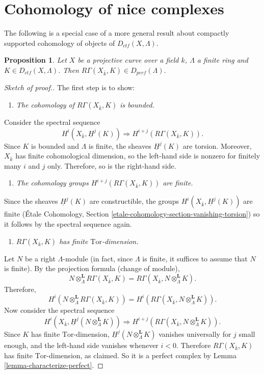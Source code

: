 \documentclass{stacks-project}
\theoremstyle{plain}
\newtheorem{proposition}[subsection]{Proposition}
\theoremstyle{definition}
\theoremstyle{remark}
\numberwithin{equation}{subsection}
\begin{document}
\section{Cohomology of nice complexes}
\label{section-cohomology-ctf}

\noindent
The following is a special case of a more general result about
compactly supported cohomology of objects of $D_{ctf}(X, \Lambda)$.

\begin{proposition}
\label{proposition-projective-curve-constructible-cohomology}
Let $X$ be a projective curve over a field $k$, $\Lambda$ a finite ring and
$K\in D_{ctf}(X, \Lambda)$. Then $R\Gamma(X_{\bar k}, K)\in
D_{perf}(\Lambda)$.
\end{proposition}

\begin{proof}[Sketch of proof.]
The first step is to show:
\begin{enumerate}
\item[(1)]
{\it The cohomology of $R\Gamma(X_{\bar k}, K)$ is bounded.}
\end{enumerate}
Consider the spectral sequence
$$
H^i(X_{\bar k}, \underline H^j(K))
\Rightarrow
H^{i+j} (R\Gamma(X_{\bar k}, K)).
$$
Since $K$ is bounded and $\Lambda$ is finite, the sheaves $\underline H^j(K)$
are torsion. Moreover, $X_{\bar k}$ has finite cohomological dimension, so the
left-hand side is nonzero for finitely many $i$ and $j$ only. Therefore, so is
the right-hand side.
\begin{enumerate}
\item[(2)]
{\it The cohomology groups $H^{i+j} (R\Gamma(X_{\bar k}, K))$ are finite.}
\end{enumerate}
Since the sheaves $\underline H^j(K)$ are constructible, the groups
$H^i(X_{\bar k}, \underline H^j(K))$ are finite
(\'Etale Cohomology, Section \ref{etale-cohomology-section-vanishing-torsion})
so it follows by the spectral sequence again.
\begin{enumerate}
\item[(3)]
{\it $R\Gamma(X_{\bar k}, K)$ has finite $\text{Tor}$-dimension.}
\end{enumerate}
Let $N$ be a right $\Lambda$-module (in fact, since $\Lambda$ is finite, it
suffices to assume that $N$ is finite). By the projection formula (change of
module),
$$
N \otimes^\mathbf{L}_\Lambda R \Gamma(X_{\bar k}, K) = R\Gamma(X_{\bar k},
N \otimes^\mathbf{L}_\Lambda K).
$$
Therefore,
$$
H^i (N \otimes^\mathbf{L}_\Lambda R\Gamma(X_{\bar k}, K)) = H^i(R\Gamma(X_{\bar
k}, N \otimes_{\Lambda}^\mathbf{L} K)).
$$
Now consider the spectral sequence
$$
H^i (X_{\bar k}, \underline H^j (N \otimes_{\Lambda}^\mathbf{L} K))
\Rightarrow
H^{i+j}(R\Gamma(X_{\bar k}, N \otimes_{\Lambda}^\mathbf{L} K)).
$$
Since $K$ has finite $\text{Tor}$-dimension, $\underline H^j
(N \otimes_{\Lambda}^\mathbf{L} K)$ vanishes universally for $j$ small enough,
and the left-hand side vanishes whenever $i < 0$. Therefore $R\Gamma(X_{\bar
k}, K)$ has finite $\text{Tor}$-dimension, as claimed. So it is a perfect
complex by Lemma \ref{lemma-characterize-perfect}.
\end{proof}
\end{document}
